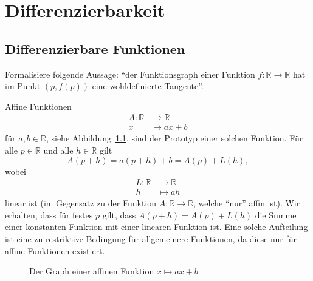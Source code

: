 \documentclass[../main.tex]{subfiles}
\begin{document}
\chapter{Differenzierbarkeit}
\section{Differenzierbare Funktionen}
\begin{goal}
  Formalisiere
  folgende Aussage:
  ``der Funktionsgraph einer Funktion
  $f \colon \mathbb{R} \to \mathbb{R}$
  hat im Punkt $(p, f(p))$ eine 
  wohldefinierte Tangente''.
\end{goal}

Affine Funktionen 
\begin{align*}
  A \colon \mathbb{R} & \to \mathbb{R} \\
  x & \mapsto ax + b
\end{align*}
für $a, b \in \mathbb{R}$,
siehe Abbildung~\ref{fig:affin},
sind der Prototyp
einer solchen Funktion.
Für alle $p \in \mathbb{R}$ und
alle $h \in \mathbb{R}$ gilt
\[
  A(p+h) = a(p+ h) + b = A(p) + L(h),
\]
wobei
\begin{align*}
  L \colon \mathbb{R} & \to \mathbb{R} \\
  h & \mapsto ah
\end{align*}
linear ist (im Gegensatz
zu der Funktion
$A \colon \mathbb{R} \to \mathbb{R}$,
welche ``nur'' affin ist).
Wir erhalten, dass für festes $p$ 
gilt, dass
  $A(p+h) = A(p) + L(h)$
die Summe einer konstanten
Funktion mit einer linearen Funktion ist.
Eine solche Aufteilung ist
eine zu restriktive Bedingung
für allgemeinere Funktionen,
da diese nur für affine Funktionen
existiert.


\begin{figure}[htb]
  \centering
  
  \caption{Der
  Graph einer affinen Funktion
$x \mapsto ax + b$}%
  \label{fig:affin}
\end{figure}
\end{document}
